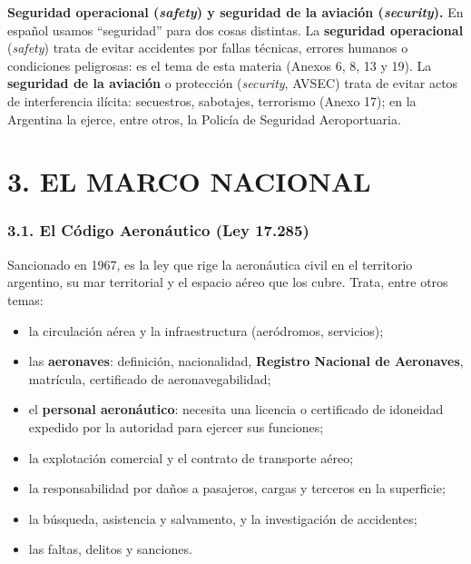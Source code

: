 \begin{recuadro}
\textbf{Seguridad operacional (\textit{safety}) y seguridad de la aviación (\textit{security}).}
En español usamos ``seguridad'' para dos cosas distintas. La \textbf{seguridad operacional}
(\textit{safety}) trata de evitar accidentes por fallas técnicas, errores humanos o
condiciones peligrosas: es el tema de esta materia (Anexos 6, 8, 13 y 19). La \textbf{seguridad
de la aviación} o protección (\textit{security}, AVSEC) trata de evitar actos de interferencia
ilícita: secuestros, sabotajes, terrorismo (Anexo 17); en la Argentina la ejerce, entre otros,
la Policía de Seguridad Aeroportuaria.
\end{recuadro}

\section*{3. EL MARCO NACIONAL}

\subsubsection*{3.1. El Código Aeronáutico (Ley 17.285)}
Sancionado en 1967, es la ley que rige la aeronáutica civil en el territorio argentino, su mar
territorial y el espacio aéreo que los cubre. Trata, entre otros temas:
\begin{itemize}
  \item la circulación aérea y la infraestructura (aeródromos, servicios);
  \item las \textbf{aeronaves}: definición, nacionalidad, \textbf{Registro Nacional de Aeronaves},
        matrícula, certificado de aeronavegabilidad;
  \item el \textbf{personal aeronáutico}: necesita una licencia o certificado de idoneidad
        expedido por la autoridad para ejercer sus funciones;
  \item la explotación comercial y el contrato de transporte aéreo;
  \item la responsabilidad por daños a pasajeros, cargas y terceros en la superficie;
  \item la búsqueda, asistencia y salvamento, y la investigación de accidentes;
  \item las faltas, delitos y sanciones.
\end{itemize}


